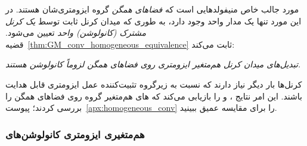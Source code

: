 مورد جالب خاص
منیفولدهایی است که \emph{فضاهای همگن} گروه ایزومتری‌شان هستند.
در این مورد تنها یک مدار واحد وجود دارد، به طوری که میدان کرنل ثابت توسط \emph{یک کرنل مشترک (کانولوشن) واحد} تعیین می‌شود.
قضیه~\ref{thm:GM_conv_homogeneous_equivalence} ثابت می‌کند:
\begin{center}\it
	تبدیل‌های میدان کرنل هم‌متغیر ایزومتری روی فضاهای همگن لزوماً کانولوشن هستند.
\end{center}
کرنل‌ها بار دیگر نیاز دارند که نسبت به زیرگروه تثبیت‌کننده عمل ایزومتری قابل هدایت باشند.
این امر نتایج \citet{Kondor2018-GENERAL}، \citet{Cohen2019-generaltheory} و \citet{bekkers2020bspline} را بازیابی می‌کند که های هم‌متغیر گروه روی فضاهای همگن را بررسی کردند؛ پیوست~\ref{apx:homogeneous_conv} را برای مقایسه عمیق ببینید.


\subsubsection{هم‌متغیری ایزومتری کانولوشن‌های }
\label{sec:visual_intro_isom_equiv_conv}

